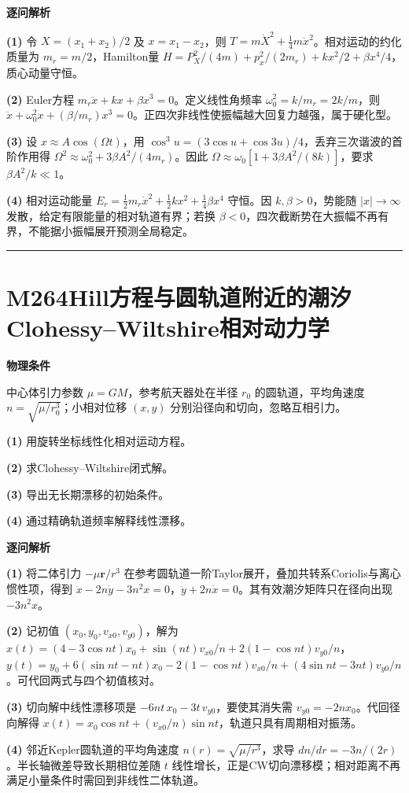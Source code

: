 \documentclass[UTF8,a4paper,11pt,oneside,openany]{ctexbook}
\begin{document}
\par\medskip\noindent\textbf{逐问解析}
\par\noindent\textbf{(1)} 令 \(X=(x_1+x_2)/2\) 及 \(x=x_1-x_2\)，则 \(T=m\dot X^2+\frac14m\dot x^2\)。相对运动的约化质量为 \(m_r=m/2\)，Hamilton量 \(H=P_X^2/(4m)+p_x^2/(2m_r)+kx^2/2+\beta x^4/4\)，质心动量守恒。
\par\noindent\textbf{(2)} Euler方程 \(m_r\ddot x+kx+\beta x^3=0\)。定义线性角频率 \(\omega_0^2=k/m_r=2k/m\)，则 \(\ddot x+\omega_0^2x+(\beta/m_r)x^3=0\)。正四次非线性使振幅越大回复力越强，属于硬化型。
\par\noindent\textbf{(3)} 设 \(x\approx A\cos(\Omega t)\)，用 \(\cos^3u=(3\cos u+\cos3u)/4\)，丢弃三次谐波的首阶作用得 \(\Omega^2\approx\omega_0^2+3\beta A^2/(4m_r)\)。因此 \(\Omega\approx\omega_0[1+3\beta A^2/(8k)]\)，要求 \(\beta A^2/k\ll1\)。
\par\noindent\textbf{(4)} 相对运动能量 \(E_r=\frac12m_r\dot x^2+\frac12kx^2+\frac14\beta x^4\) 守恒。因 \(k,\beta>0\)，势能随 \(|x|\to\infty\) 发散，给定有限能量的相对轨道有界；若换 \(\beta<0\)，四次截断势在大振幅不再有界，不能据小振幅展开预测全局稳定。

\par\bigskip\hrule\bigskip
\section*{M264\quad Hill方程与圆轨道附近的潮汐Clohessy–Wiltshire相对动力学}
\textbf{物理条件}\par 中心体引力参数 \(\mu=GM\)，参考航天器处在半径 \(r_0\) 的圆轨道，平均角速度 \(n=\sqrt{\mu/r_0^3}\)；小相对位移 \((x,y)\) 分别沿径向和切向，忽略互相引力。
\par\noindent\textbf{(1)} 用旋转坐标线性化相对运动方程。
\par\noindent\textbf{(2)} 求Clohessy–Wiltshire闭式解。
\par\noindent\textbf{(3)} 导出无长期漂移的初始条件。
\par\noindent\textbf{(4)} 通过精确轨道频率解释线性漂移。

\par\medskip\noindent\textbf{逐问解析}
\par\noindent\textbf{(1)} 将二体引力 \(-\mu\boldsymbol r/r^3\) 在参考圆轨道一阶Taylor展开，叠加共转系Coriolis与离心惯性项，得到 \(\ddot x-2n\dot y-3n^2x=0\)，\(\ddot y+2n\dot x=0\)。其有效潮汐矩阵只在径向出现 \(-3n^2x\)。
\par\noindent\textbf{(2)} 记初值 \((x_0,y_0,v_{x0},v_{y0})\)，解为 \(x(t)=(4-3\cos nt)x_0+\sin(nt)v_{x0}/n+2(1-\cos nt)v_{y0}/n\)，\(y(t)=y_0+6(\sin nt-nt)x_0-2(1-\cos nt)v_{x0}/n+(4\sin nt-3nt)v_{y0}/n\)。可代回两式与四个初值核对。
\par\noindent\textbf{(3)} 切向解中线性漂移项是 \(-6nt\,x_0-3t\,v_{y0}\)，要使其消失需 \(v_{y0}=-2nx_0\)。代回径向解得 \(x(t)=x_0\cos nt+(v_{x0}/n)\sin nt\)，轨道只具有周期相对振荡。
\par\noindent\textbf{(4)} 邻近Kepler圆轨道的平均角速度 \(n(r)=\sqrt{\mu/r^3}\)，求导 \(dn/dr=-3n/(2r)\)。半长轴微差导致长期相位差随 \(t\) 线性增长，正是CW切向漂移模；相对距离不再满足小量条件时需回到非线性二体轨道。
\end{document}
